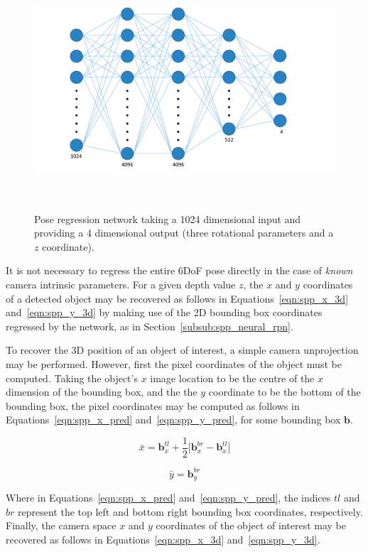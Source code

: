 \begin{figure}[!htbp]
  \centering
  \includegraphics[width=.8\linewidth]{figures/spp/pose_net_diagram.pdf}
  \caption[Pose Regression Network]{Pose regression network taking a 1024 dimensional 
  input and providing a 4 dimensional output (three rotational parameters and a \( z \) coordinate).}
~\label{figure:spp_pose_block}
\end{figure}

It is not necessary to regress the entire 6DoF pose directly in the case of \textit{known} camera intrinsic 
parameters. For a given depth value \( z \), the \( x \) and \( y \) coordinates of a detected object may 
be recovered as follows in Equations~\ref{eqn:spp_x_3d} and~\ref{eqn:spp_y_3d} by making use of the 2D bounding 
box coordinates regressed by the network, as in Section~\ref{subsub:spp_neural_rpn}.

To recover the 3D position of an object of interest, a simple camera unprojection may be performed. 
However, first the pixel coordinates of the object must be computed. Taking the object's \( x \) image 
location to be the centre of the \( x \) dimension of the bounding box, and the the \( y \) coordinate 
to be the bottom of the bounding box, the pixel coordinates may be computed as follows in 
Equations~\ref{eqn:spp_x_pred} and~\ref{eqn:spp_y_pred}, for some bounding box \( \bm{b} \).

\begin{equation}
  \label{eqn:spp_x_pred}
  \bar{x} = \bm{b}_{x}^{tl} + \frac{1}{2} \Big[ \bm{b}_{x}^{br} - \bm{b}_{x}^{tl} \Big]
\end{equation}

\begin{equation}
  \label{eqn:spp_y_pred}
  \bar{y} = \bm{b}_{y}^{br}
\end{equation}

Where in Equations~\ref{eqn:spp_x_pred} and~\ref{eqn:spp_y_pred}, the indices \( tl \) and \( br \) 
represent the top left and bottom right bounding box coordinates, respectively. Finally, the camera 
space \( x \) and \( y \) coordinates of the object of interest may be recovered as follows in 
Equations~\ref{eqn:spp_x_3d} and~\ref{eqn:spp_y_3d}.

